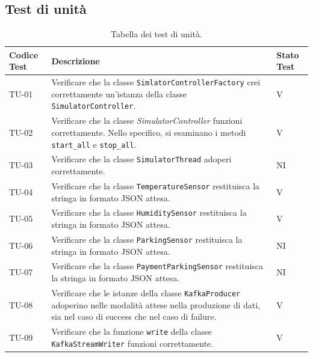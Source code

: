 \documentclass[8pt]{article}
\begin{document}
\subsection{Test di unità}
\renewcommand{\arraystretch}{2.5}
\begin{longtable}{|>{\centering}p{2cm}|>{\RaggedRight}m{12cm}|>{\centering\arraybackslash}p{2cm}|}
    \hline
    \rowcolor{white}
    \textbf{Codice Test} & \textbf{Descrizione} & \textbf{Stato Test} \\
    \hline
    \endfirsthead 
    \rowcolor{white}
    \caption{Tabella dei test di unità.} 
    \label{table:Tabella dei test di unità}
    \endlastfoot 
    
    TU-01 & Verificare che la classe \verb|SimlatorControllerFactory| crei correttamente un'istanza
    della classe \verb|SimulatorController|.  & V \\
    \hline

    TU-02 & Verificare che la classe \textit{SimulatorController} funzioni correttamente. Nello
    specifico, si esaminano i metodi \verb|start_all| e \verb|stop_all|.  & V \\
    \hline

    TU-03 & Verificare che la classe \verb|SimulatorThread| adoperi correttamente. & NI \\
    \hline

    TU-04 & Verificare che la classe \verb|TemperatureSensor| restituisca la stringa in formato JSON attesa. & V \\
    \hline

    TU-05 & Verificare che la classe \verb|HumiditySensor| restituisca la stringa in formato JSON attesa. & V \\
    \hline

    TU-06 & Verificare che la classe \verb|ParkingSensor| restituisca la stringa in formato JSON attesa. & NI \\
    \hline

    TU-07 & Verificare che la classe \verb|PaymentParkingSensor| restituisca la stringa in formato JSON attesa. & NI \\
    \hline
    TU-08 & Verificare che le istanze della classe \verb|KafkaProducer| adoperino nelle modalità attese nella produzione di dati, sia nel caso di success che nel caso di failure. & V \\
    \hline

    TU-09 & Verificare che la funzione \verb|write| della classe \verb|KafkaStreamWriter| funzioni correttamente. & V \\
    \hline


\end{longtable}
\end{document}
